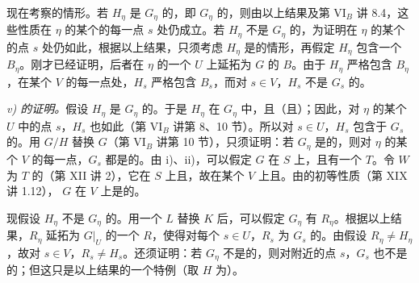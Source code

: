 现在考察的情形。若 $H_\eta$ 是 $G_\eta$ 的，即 $G_\eta$ 的，则由以上结果及第 VI$_B$ 讲 8.4，这些性质在 $\eta$ 的某个的每一点 $s$ 处仍成立。若 $H_\eta$ 不是 $G_\eta$ 的，为证明在 $\eta$ 的某个的点 $s$ 处仍如此，根据以上结果，只须考虑 $H_\eta$ 是的情形，再假定 $H_\eta$ 包含一个 $B_\eta$。刚才已经证明，后者在 $\eta$ 的一个 $U$ 上延拓为 $G$ 的 $B$。由于 $H_\eta$ 严格包含 $B_\eta$，在某个 $V$ 的每一点处，$H_s$ 严格包含 $B_s$，而对 $s\in V$，$H_s$ 不是 $G_s$ 的。

\emph{v) 的证明。}假设 $H_\eta$ 是 $G_\eta$ 的。于是 $H_\eta$ 在 $G_\eta$ 中，且（且）；因此，对 $\eta$ 的某个 $U$ 中的点 $s$，$H_s$ 也如此（第 VI$_B$ 讲第 8、10 节）。所以对 $s\in U$，$H_s$ 包含于 $G_s$ 的。用 $G/H$ 替换 $G$（第 VI$_B$ 讲第 10 节），只须证明：若 $G_\eta$ 是的，则对 $\eta$ 的某个 $V$ 的每一点，$G_s$ 都是的。由 i)、ii)，可以假定 $G$ 在 $S$ 上，且有一个 $T$。令 $W$ 为 $T$ 的（第 XII 讲 2），它在 $S$ 上且，故在某个 $V$ 上且。由的初等性质（第 XIX 讲 1.12）， $G$ 在 $V$ 上是的。

现假设 $H_\eta$ 不是 $G_\eta$ 的。用一个 $L$ 替换 $K$ 后，可以假定 $G_\eta$ 有 $R_\eta$。根据以上结果，$R_\eta$ 延拓为 $G|_U$ 的一个 $R$，使得对每个 $s\in U$，$R_s$ 为 $G_s$ 的。由假设 $R_\eta\ne H_\eta$，故对 $s\in V$，$R_s\ne H_s$。还须证明：若 $G_\eta$ 不是的，则对附近的点 $s$，$G_s$ 也不是的；但这只是以上结果的一个特例（取 $H$ 为）。


